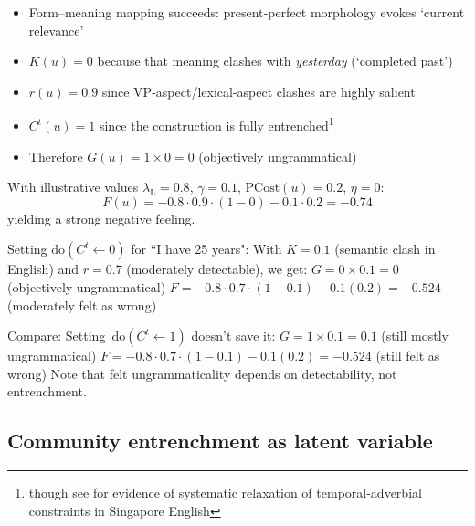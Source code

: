 \documentclass[12pt]{article}
\newcommand{\listener}{\mathrm{L}}
\begin{document}
\begin{itemize}
  \item Form–meaning mapping succeeds: present‑perfect morphology evokes `current relevance'
  \item $K(u)=0$ because that meaning clashes with \textit{yesterday} (`completed past')
  \item $r(u)=0.9$ since VP-aspect/lexical-aspect clashes are highly salient
  \item $C^{t}(u)=1$ since the construction is fully entrenched\footnote{though see \textcite{lai2013opt} for evidence of systematic relaxation of temporal-adverbial constraints in Singapore English}
  \item Therefore $G(u)=1\times0=0$ (objectively ungrammatical)
\end{itemize}
With illustrative values $\lambda_{\listener}=0.8$, $\gamma=0.1$, $\text{PCost}(u)=0.2$, $\eta=0$:
\begin{equation}
F(u)=-0.8\cdot0.9\cdot(1-0)-0.1\cdot0.2=-0.74
\end{equation}
yielding a strong negative feeling.

\begin{tcolorbox}[colback=lsLightBlue!20,title=Causal intervention example]
Setting $\text{do}(C^{t} \leftarrow 0)$ for ``I have 25 years":
With $K = 0.1$ (semantic clash in English) and $r = 0.7$ (moderately detectable), we get:
$G = 0 \times 0.1 = 0$ (objectively ungrammatical)
$F = -0.8 \cdot 0.7 \cdot (1-0.1) - 0.1(0.2) = -0.524$ (moderately felt as wrong)

Compare: Setting~$\text{do}(C^{t} \leftarrow 1)$ doesn't save it:
$G = 1 \times 0.1 = 0.1$ (still mostly ungrammatical)
$F = -0.8 \cdot 0.7 \cdot (1-0.1) - 0.1(0.2) = -0.524$ (still felt as wrong)
Note that felt ungrammaticality depends on detectability, not entrenchment.
\end{tcolorbox}

\subsection{Community entrenchment as latent variable}
\end{document}
